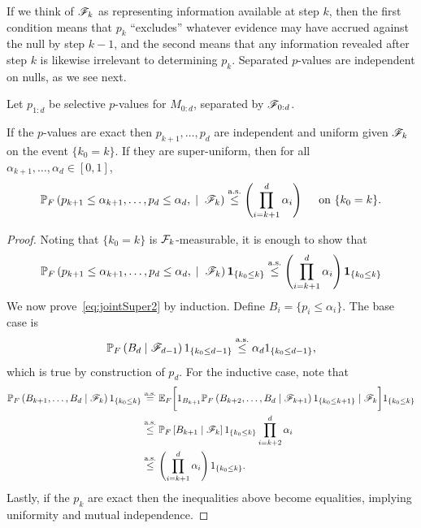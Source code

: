 \documentclass{article}
\begin{document}
If we think of $\mathscr{F}_k$ as representing information available at step $k$, then the first condition means that $p_k$ ``excludes'' whatever evidence may have accrued against the null by step $k-1$, and the second means that any information revealed after step $k$ is likewise irrelevant to determining $p_k$. Separated $p$-values are independent on nulls, as we see next.

\begin{proposition}\label{prop:jointConserv}

  Let $p_{1:d}$ be selective $p$-values for $M_{0:d}$, 
  separated by $\mathscr{F}_{0:d}$.

  If the $p$-values are exact then $p_{k+1}, \ldots, p_d$ are
  independent and uniform given $\mathscr{F}_k$ on the event $\{k_0=k\}$.
  If they are super-uniform, then for all
  $\alpha_{k+1},\ldots,\alpha_d \in [0,1]$,
  \begin{equation}\label{eq:jointSuper}
  \mathbb{P}_F\left(p_{k+1}\leq \alpha_{k+1}, \ldots, p_d \leq \alpha_d, \;
    \mid\; \mathscr{F}_k\right) \overset{\textrm{a.s.}}{\leq} \left(\prod_{i=k+1}^d
  \alpha_i\right) \quad \text{ on } \{k_0 = k\}.
  \end{equation}
\end{proposition}

\begin{proof}
  Noting that $\{k_0=k\}$ is $\mathcal{F}_k$-measurable, it is enough to show that 
  \begin{equation}\label{eq:jointSuper2}
  \mathbb{P}_F\left(p_{k+1}\leq \alpha_{k+1}, \ldots, p_d \leq \alpha_d, \;
    \mid\; \mathscr{F}_k\right)\mathbf{1}_{\{k_0\leq k\}} \overset{\textrm{a.s.}}{\leq} \left(\prod_{i=k+1}^d
  \alpha_i\right)\mathbf{1}_{\{k_0\leq k\}}
  \end{equation}
  We now prove~\eqref{eq:jointSuper2} by induction. Define $B_i = \{p_i \leq \alpha_i\}$. The base case is
  \[
  \mathbb{P}_F\left(B_d \mid \mathscr{F}_{d-1}\right)1_{\{k_0 \leq d-1\}} \overset{\textrm{a.s.}}{\leq} \alpha_d
1_{\{k_0 \leq d-1\}},
  \]
  which is true by construction of $p_d$. 
  For the inductive case, note that 
  \begin{align*}
    \mathbb{P}_F\left(B_{k+1}, \ldots, B_d
      \mid \mathscr{F}_k\right)1_{\{k_0 \leq k\}} 
    &\overset{\textrm{a.s.}}{=} \mathbb{E}_F\bigg[ 1_{B_{k+1}} 
    \mathbb{P}_F\left(B_{k+2}, \ldots, B_d
      \mid \mathscr{F}_{k+1}\right)1_{\{k_0 \leq k+1\}}
    \mid \mathscr{F}_k\bigg]1_{\{k_0 \leq k\}}\\
    &\overset{\textrm{a.s.}}{\leq} \mathbb{P}_F\left[ B_{k+1}
      \mid \mathscr{F}_k\right]1_{\{k_0 \leq k\}}\prod_{i=k+2}^d \alpha_i \\
    &\overset{\textrm{a.s.}}{\leq} \left(\prod_{i=k+1}^d \alpha_i \right)1_{\{k_0 \leq k\}} .
  \end{align*}
Lastly, if the $p_k$ are exact then the inequalities above become equalities, implying uniformity and mutual independence.
\end{proof}
\end{document}
